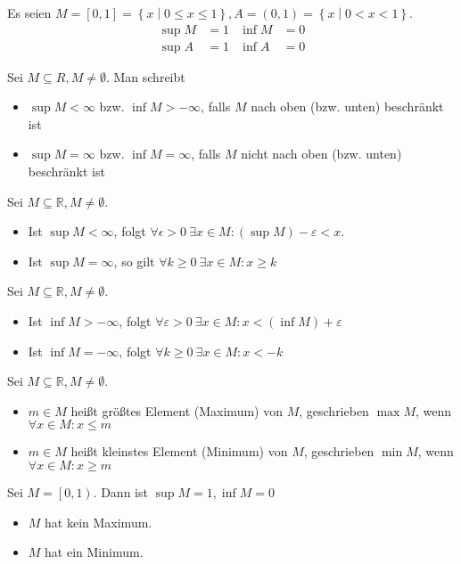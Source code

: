 \begin{example}
  Es seien $M = [0, 1] = \left\{ x \middle| 0 \le x \le 1 \right\}, A = (0, 1) = \left\{ x \middle| 0 < x < 1 \right\}$.
  \begin{align*}
    \operatorname{sup} M &= 1 & \operatorname{inf} M &= 0 \\
    \operatorname{sup} A &= 1 & \operatorname{inf} A &= 0
  \end{align*}
\end{example}
\begin{notation}
  Sei $M \subseteq R, M \ne \emptyset$. Man schreibt
  \begin{itemize}
  \item $\operatorname{sup} M < \infty$ bzw. $\operatorname{inf} M > -\infty$, falls $M$ nach oben (bzw. unten) beschränkt ist
  \item $\operatorname{sup} M = \infty$ bzw. $\operatorname{inf} M = \infty$, falls $M$ nicht nach oben (bzw. unten) beschränkt ist
  \end{itemize}
\end{notation}
\begin{theorem}
  Sei $M \subseteq \mathbb{R}, M \ne \emptyset$.
  \begin{itemize}
  \item Ist $\operatorname{sup} M < \infty$, folgt $\forall \epsilon > 0\: \exists x \in M: (\operatorname{sup} M)-\varepsilon < x$.
  \item Ist $\operatorname{sup} M = \infty$, so gilt $\forall k \ge 0\: \exists x \in M: x \ge k$
  \end{itemize}
\end{theorem}
\begin{theorem}
  Sei $M \subseteq \mathbb{R}, M \ne \emptyset$.
  \begin{itemize}
  \item Ist $\operatorname{inf} M > -\infty$, folgt $\forall \varepsilon > 0\: \exists x \in M: x < (\operatorname{inf} M)+\varepsilon$
  \item Ist $\operatorname{inf} M = -\infty$, folgt $\forall k \ge 0\: \exists x \in M: x < -k$
  \end{itemize}
\end{theorem}
\begin{theorem}
  Sei $M \subseteq \mathbb{R}, M \ne \emptyset$.
  \begin{itemize}
  \item $m \in M$ heißt größtes Element (Maximum) von $M$, geschrieben $\operatorname{max} M$, wenn $\forall x \in M: x \le m$
  \item $m \in M$ heißt kleinstes Element (Minimum) von $M$, geschrieben $\operatorname{min} M$, wenn $\forall x \in M: x \ge m$
  \end{itemize}
\end{theorem}
\begin{example}
  Sei $M = \left[0, 1\right)$. Dann ist $\operatorname{sup} M = 1, \operatorname{inf} M = 0$
  \begin{itemize}
  \item $M$ hat kein Maximum.
  \item $M$ hat ein Minimum.
  \end{itemize}
\end{example}